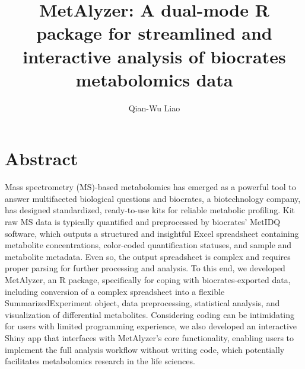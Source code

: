 \documentclass[12pt, a4paper]{article}
\title{
    \vspace{-25mm}
    \large \bfseries MetAlyzer: A dual-mode R package for streamlined and interactive analysis of biocrates metabolomics data
    \vspace{-4mm}
    }
\author{
    \vspace{-2mm}
    \hspace{-5mm} \small Qian-Wu Liao
    }
\date{}
\begin{document}
\maketitle
\vspace{-8mm}

\section*{\large Abstract}
Mass spectrometry (MS)-based metabolomics has emerged as a powerful tool to answer multifaceted biological questions and biocrates, a biotechnology company, has designed standardized, ready-to-use kits for reliable metabolic profiling. Kit raw MS data is typically quantified and preprocessed by biocrates' MetIDQ software, which outputs a structured and insightful Excel spreadsheet containing metabolite concentrations, color-coded quantification statuses, and sample and metabolite metadata. Even so, the output spreadsheet is complex and requires proper parsing for further processing and analysis. To this end, we developed MetAlyzer, an R package, specifically for coping with biocrates-exported data, including conversion of a complex spreadsheet into a flexible SummarizedExperiment object, data preprocessing, statistical analysis, and visualization of differential metabolites. Considering coding can be intimidating for users with limited programming experience, we also developed an interactive Shiny app that interfaces with MetAlyzer's core functionality, enabling users to implement the full analysis workflow without writing code, which potentially facilitates metabolomics research in the life sciences.
\end{document}
